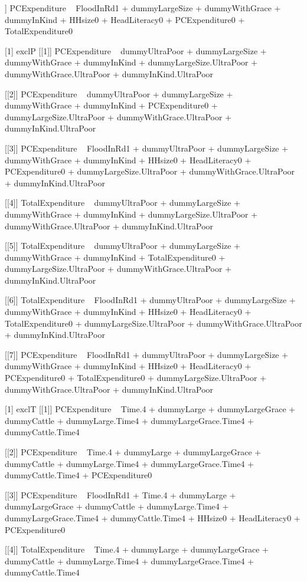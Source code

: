 \begin{Schunk}
\begin{Soutput}
[[7]]
PCExpenditure ~ FloodInRd1 + dummyLargeSize + dummyWithGrace + 
    dummyInKind + HHsize0 + HeadLiteracy0 + PCExpenditure0 + 
    TotalExpenditure0

[1] exclP
[[1]]
PCExpenditure ~ dummyUltraPoor + dummyLargeSize + dummyWithGrace + 
    dummyInKind + dummyLargeSize.UltraPoor + dummyWithGrace.UltraPoor + 
    dummyInKind.UltraPoor

[[2]]
PCExpenditure ~ dummyUltraPoor + dummyLargeSize + dummyWithGrace + 
    dummyInKind + PCExpenditure0 + dummyLargeSize.UltraPoor + 
    dummyWithGrace.UltraPoor + dummyInKind.UltraPoor

[[3]]
PCExpenditure ~ FloodInRd1 + dummyUltraPoor + dummyLargeSize + 
    dummyWithGrace + dummyInKind + HHsize0 + HeadLiteracy0 + 
    PCExpenditure0 + dummyLargeSize.UltraPoor + dummyWithGrace.UltraPoor + 
    dummyInKind.UltraPoor

[[4]]
TotalExpenditure ~ dummyUltraPoor + dummyLargeSize + dummyWithGrace + 
    dummyInKind + dummyLargeSize.UltraPoor + dummyWithGrace.UltraPoor + 
    dummyInKind.UltraPoor

[[5]]
TotalExpenditure ~ dummyUltraPoor + dummyLargeSize + dummyWithGrace + 
    dummyInKind + TotalExpenditure0 + dummyLargeSize.UltraPoor + 
    dummyWithGrace.UltraPoor + dummyInKind.UltraPoor

[[6]]
TotalExpenditure ~ FloodInRd1 + dummyUltraPoor + dummyLargeSize + 
    dummyWithGrace + dummyInKind + HHsize0 + HeadLiteracy0 + 
    TotalExpenditure0 + dummyLargeSize.UltraPoor + dummyWithGrace.UltraPoor + 
    dummyInKind.UltraPoor

[[7]]
PCExpenditure ~ FloodInRd1 + dummyUltraPoor + dummyLargeSize + 
    dummyWithGrace + dummyInKind + HHsize0 + HeadLiteracy0 + 
    PCExpenditure0 + TotalExpenditure0 + dummyLargeSize.UltraPoor + 
    dummyWithGrace.UltraPoor + dummyInKind.UltraPoor

[1] exclT
[[1]]
PCExpenditure ~ Time.4 + dummyLarge + dummyLargeGrace + dummyCattle + 
    dummyLarge.Time4 + dummyLargeGrace.Time4 + dummyCattle.Time4

[[2]]
PCExpenditure ~ Time.4 + dummyLarge + dummyLargeGrace + dummyCattle + 
    dummyLarge.Time4 + dummyLargeGrace.Time4 + dummyCattle.Time4 + 
    PCExpenditure0

[[3]]
PCExpenditure ~ FloodInRd1 + Time.4 + dummyLarge + dummyLargeGrace + 
    dummyCattle + dummyLarge.Time4 + dummyLargeGrace.Time4 + 
    dummyCattle.Time4 + HHsize0 + HeadLiteracy0 + PCExpenditure0

[[4]]
TotalExpenditure ~ Time.4 + dummyLarge + dummyLargeGrace + dummyCattle + 
    dummyLarge.Time4 + dummyLargeGrace.Time4 + dummyCattle.Time4


\end{Soutput}
\end{Schunk}
